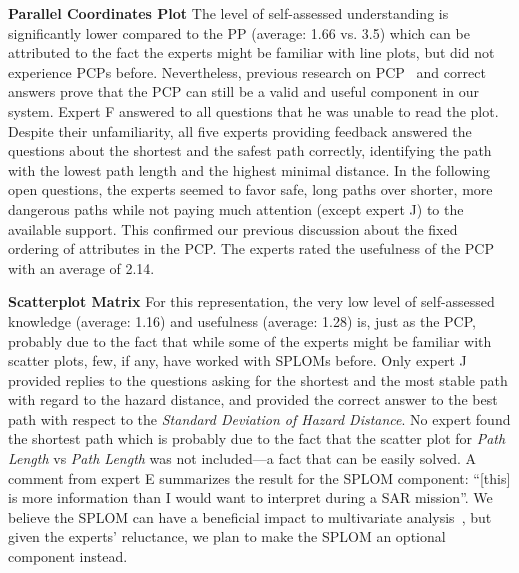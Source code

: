 \documentclass[review,journal]{vgtc}         %
\begin{document}
\noindent \textbf{Parallel Coordinates Plot} The level of self-assessed understanding is significantly lower compared to the PP (average: 1.66 vs. 3.5) which can be attributed to the fact the experts might be familiar with line plots, but did not experience PCPs before. Nevertheless, previous research on PCP~\cite{CGF:CGF1666} and correct answers prove that the PCP can still be a valid and useful component in our system. Expert F answered to all questions that he was unable to read the plot. Despite their unfamiliarity, all five experts providing feedback answered the questions about the shortest and the safest path correctly, identifying the path with the lowest path length and the highest minimal distance. In the following open questions, the experts seemed to favor safe, long paths over shorter, more dangerous paths while not paying much attention (except expert J) to the available support. This confirmed our previous discussion about the fixed ordering of attributes in the PCP. The experts rated the usefulness of the PCP with an average of 2.14. 

\noindent \textbf{Scatterplot Matrix} For this representation, the very low level of self-assessed knowledge (average: 1.16) and usefulness (average: 1.28) is, just as the PCP, probably due to the fact that while some of the experts might be familiar with scatter plots, few, if any, have worked with SPLOMs before. Only expert J provided replies to the questions asking for the shortest and the most stable path with regard to the hazard distance, and provided the correct answer to the best path with respect to the \emph{Standard Deviation of Hazard Distance}. No expert found the shortest path which is probably due to the fact that the scatter plot for \emph{Path Length} vs \emph{Path Length} was not included---a fact that can be easily solved. A comment from expert E summarizes the result for the SPLOM component: ``[this] is more information than I would want to interpret during a SAR mission''. We believe the SPLOM can have a beneficial impact to multivariate analysis~\cite{6064985}, but given the experts' reluctance, we plan to make the SPLOM an optional component instead.
\end{document}
